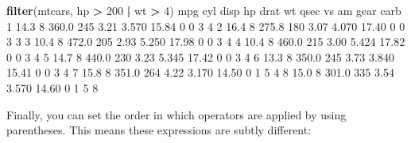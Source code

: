 \documentclass[]{article}
\newenvironment{Shaded}{\begin{snugshade}}{\end{snugshade}}
\newcommand{\DecValTok}[1]{\textcolor[rgb]{0.00,0.00,0.81}{#1}}
\newcommand{\FloatTok}[1]{\textcolor[rgb]{0.00,0.00,0.81}{#1}}
\newcommand{\KeywordTok}[1]{\textcolor[rgb]{0.13,0.29,0.53}{\textbf{#1}}}
\newcommand{\NormalTok}[1]{#1}
\newcommand{\OperatorTok}[1]{\textcolor[rgb]{0.81,0.36,0.00}{\textbf{#1}}}
\newcommand{\StringTok}[1]{\textcolor[rgb]{0.31,0.60,0.02}{#1}}
\begin{document}
\begin{Shaded}
\begin{Highlighting}[]
\KeywordTok{filter}\NormalTok{(mtcars, hp }\OperatorTok{>}\StringTok{ }\DecValTok{200} \OperatorTok{|}\StringTok{ }\NormalTok{wt }\OperatorTok{>}\StringTok{ }\DecValTok{4}\NormalTok{)}
\NormalTok{   mpg cyl  disp  hp drat    wt  qsec vs am gear carb}
\DecValTok{1} \FloatTok{14.3}   \DecValTok{8} \FloatTok{360.0} \DecValTok{245} \FloatTok{3.21} \FloatTok{3.570} \FloatTok{15.84}  \DecValTok{0}  \DecValTok{0}    \DecValTok{3}    \DecValTok{4}
\DecValTok{2} \FloatTok{16.4}   \DecValTok{8} \FloatTok{275.8} \DecValTok{180} \FloatTok{3.07} \FloatTok{4.070} \FloatTok{17.40}  \DecValTok{0}  \DecValTok{0}    \DecValTok{3}    \DecValTok{3}
\DecValTok{3} \FloatTok{10.4}   \DecValTok{8} \FloatTok{472.0} \DecValTok{205} \FloatTok{2.93} \FloatTok{5.250} \FloatTok{17.98}  \DecValTok{0}  \DecValTok{0}    \DecValTok{3}    \DecValTok{4}
\DecValTok{4} \FloatTok{10.4}   \DecValTok{8} \FloatTok{460.0} \DecValTok{215} \FloatTok{3.00} \FloatTok{5.424} \FloatTok{17.82}  \DecValTok{0}  \DecValTok{0}    \DecValTok{3}    \DecValTok{4}
\DecValTok{5} \FloatTok{14.7}   \DecValTok{8} \FloatTok{440.0} \DecValTok{230} \FloatTok{3.23} \FloatTok{5.345} \FloatTok{17.42}  \DecValTok{0}  \DecValTok{0}    \DecValTok{3}    \DecValTok{4}
\DecValTok{6} \FloatTok{13.3}   \DecValTok{8} \FloatTok{350.0} \DecValTok{245} \FloatTok{3.73} \FloatTok{3.840} \FloatTok{15.41}  \DecValTok{0}  \DecValTok{0}    \DecValTok{3}    \DecValTok{4}
\DecValTok{7} \FloatTok{15.8}   \DecValTok{8} \FloatTok{351.0} \DecValTok{264} \FloatTok{4.22} \FloatTok{3.170} \FloatTok{14.50}  \DecValTok{0}  \DecValTok{1}    \DecValTok{5}    \DecValTok{4}
\DecValTok{8} \FloatTok{15.0}   \DecValTok{8} \FloatTok{301.0} \DecValTok{335} \FloatTok{3.54} \FloatTok{3.570} \FloatTok{14.60}  \DecValTok{0}  \DecValTok{1}    \DecValTok{5}    \DecValTok{8}
\end{Highlighting}
\end{Shaded}

Finally, you can set the order in which operators are applied by using
parentheses. This means these expressions are subtly different:
\end{document}
